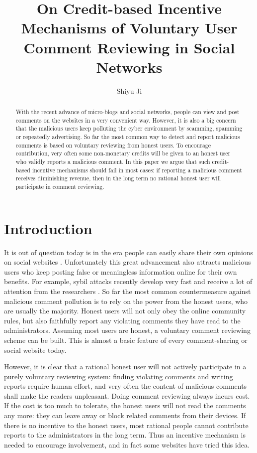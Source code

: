 \documentclass[12pt]{article}
\begin{document}
\title{\Large\bf On Credit-based Incentive Mechanisms of Voluntary User Comment Reviewing in Social Networks}
\author{Shiyu Ji}
\maketitle

\begin{abstract}
With the recent advance of micro-blogs and social networks, people can view and post comments on the websites in a very convenient way.
However, it is also a big concern that the malicious users keep polluting the cyber environment by scamming, spamming or repeatedly advertising.
So far the most common way to detect and report malicious comments is based on voluntary reviewing from honest users. 
To encourage contribution, very often some non-monetary credits will be given to an honest user who validly reports a malicious comment. 
In this paper we argue that such credit-based incentive mechanisms should fail in most cases:
if reporting a malicious comment receives diminishing revenue, then in the long term no rational honest user will participate in comment reviewing.
\end{abstract}

\section{Introduction}
It is out of question today is in the era people can easily share their own opinions on social websites \cite{E07,ECL07}. Unfortunately this great advancement also attracts malicious users who keep posting false or meaningless information online for their own benefits. For example, sybil attacks recently develop very fast and receive a lot of attention from the researchers \cite{D02,N04}. So far the most common countermeasure against malicious comment pollution is to rely on the power from the honest users, who are usually the majority. Honest users will not only obey the online community rules, but also faithfully report any violating comments they have read to the administrators. Assuming most users are honest, a voluntary comment reviewing scheme can be built. This is almost a basic feature of every comment-sharing or social website today.

However, it is clear that a rational honest user will not actively participate in a purely voluntary reviewing system: finding violating comments and writing reports require human effort, and very often the content of malicious comments shall make the readers unpleasant. Doing comment reviewing always incurs cost. If the cost is too much to tolerate, the honest users will not read the comments any more: they can leave away or block related comments from their devices. If there is no incentive to the honest users, most rational people cannot contribute reports to the administrators in the long term. Thus an incentive mechanism is needed to encourage involvement, and in fact some websites have tried this idea.
\end{document}
